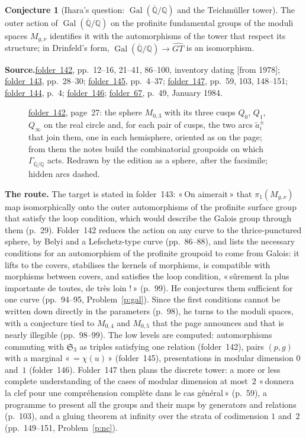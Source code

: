 \documentclass[11pt]{article}
\newcommand{\q}[1]{«\,#1\,»}
\newcommand{\fac}[1]{\href{https://grothendieck.umontpellier.fr/#1.pdf}{folder~#1}}
\newcommand{\Gal}{\operatorname{Gal}}
\theoremstyle{definition}
\theoremstyle{plain}\newtheorem*{proposition}{Proposition}\theoremstyle{definition}
\newtheorem{bigconj}{Conjecture}
\newcommand{\entry}[1]{\par\medskip\noindent\textbf{#1}\enspace}
\newcommand{\src}[1]{\entry{Source.}#1}
\begin{document}
\begin{bigconj}[Ihara's question: $\Gal(\overline{\mathbb Q}/\mathbb Q)$ and the Teichmüller tower]\label{c:gt}
The outer action of $\Gal(\overline{\mathbb Q}/\mathbb Q)$ on the profinite fundamental groups of the moduli spaces $M_{g,\nu}$ identifies it with the automorphisms of the tower that respect its structure; in Drinfeld's form, $\Gal(\overline{\mathbb Q}/\mathbb Q) \to \widehat{GT}$ is an isomorphism.
\end{bigconj}

\src{\fac{142}, pp.~12--16, 21--41, 86--100, inventory dating [from 1978]; \fac{143}, pp.~28--30; \fac{145}, pp.~4--37; \fac{147}, pp.~59, 103, 148--151; \fac{144}, p.~4; \fac{146}; \fac{67}, p.~49, January 1984.}

\begin{figure}[htbp]
\centering
\resizebox{0.5\linewidth}{!}{}
\caption{\fac{142}, page~27: the sphere $M_{0,3}$ with its three cusps $Q_0$, $Q_1$, $Q_\infty$ on the real circle and, for each pair of cusps, the two arcs $\tilde a_i^{\pm}$ that join them, one in each hemisphere, oriented as on the page; from them the notes build the combinatorial groupoids on which $\Gamma_{\overline{\mathbb Q}/\mathbb Q}$ acts. Redrawn by the edition as a sphere, after the facsimile; hidden arcs dashed.}\label{fig:142-p27}
\end{figure}

\entry{The route.} The target is stated in folder~143: \q{On aimerait} that $\pi_1(M_{g,\nu})$ map isomorphically onto the outer automorphisms of the profinite surface group that satisfy the loop condition, which would describe the Galois group through them (p.~29). Folder~142 reduces the action on any curve to the thrice-punctured sphere, by Belyi and a Lefschetz-type curve (pp.~86--88), and lists the necessary conditions for an automorphism of the profinite groupoid to come from Galois: it lifts to the covers, stabilises the kernels of morphisms, is compatible with morphisms between covers, and satisfies the loop condition, \q{sûrement la plus importante de toutes, de très loin !} (p.~99). He conjectures them sufficient for one curve (pp.~94--95, Problem~\ref{p:gal}). Since the first conditions cannot be written down directly in the parameters (p.~98), he turns to the moduli spaces, with a conjecture tied to $M_{0,4}$ and $M_{0,5}$ that the page announces and that is nearly illegible (pp.~98--99). The low levels are computed: automorphisms commuting with $\mathfrak S_3$ as triples satisfying one relation (folder~142), pairs $(p, g)$ with a marginal \q{$= \chi(u)$} (folder~145), presentations in modular dimension $0$ and~$1$ (folder~146). Folder~147 then plans the discrete tower: a more or less complete understanding of the cases of modular dimension at most~$2$ \q{donnera la clef pour une compréhension complète dans le cas général} (p.~59), a programme to present all the groups and their maps by generators and relations (p.~103), and a gluing theorem at infinity over the strata of codimension $1$ and~$2$ (pp.~149--151, Problem~\ref{p:nc}).
\end{document}
